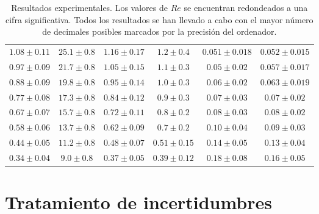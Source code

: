 \begin{table*}[h]
\begin{tabular}{cccccc}
$1.08 \pm 0.11$   &   $25.1 \pm 0.8$   &   $1.16 \pm 0.17$   &   $1.2 \pm 0.4$   &   $0.051 \pm 0.018$   &   $0.052 \pm 0.015$  \\
$0.97 \pm 0.09$   &   $21.7 \pm 0.8$   &   $1.05 \pm 0.15$   &   $1.1 \pm 0.3$   &   $0.05 \pm 0.02$   &   $0.057 \pm 0.017$  \\
$0.88 \pm 0.09$   &   $19.8 \pm 0.8$   &   $0.95 \pm 0.14$   &   $1.0 \pm 0.3$   &   $0.06 \pm 0.02$   &   $0.063 \pm 0.019$  \\
$0.77 \pm 0.08$   &   $17.3 \pm 0.8$   &   $0.84 \pm 0.12$   &   $0.9 \pm 0.3$   &   $0.07 \pm 0.03$   &   $0.07 \pm 0.02$  \\
$0.67 \pm 0.07$   &   $15.7 \pm 0.8$   &   $0.72 \pm 0.11$   &   $0.8 \pm 0.2$   &   $0.08 \pm 0.03$   &   $0.08 \pm 0.02$  \\
$0.58 \pm 0.06$   &   $13.7 \pm 0.8$   &   $0.62 \pm 0.09$   &   $0.7 \pm 0.2$   &   $0.10 \pm 0.04$   &   $0.09 \pm 0.03$  \\
$0.44 \pm 0.05$   &   $11.2 \pm 0.8$   &   $0.48 \pm 0.07$   &   $0.51 \pm 0.15$   &   $0.14 \pm 0.05$   &   $0.13 \pm 0.04$  \\
$0.34 \pm 0.04$   &   $9.0 \pm 0.8$    &   $0.37 \pm 0.05$   &   $0.39 \pm 0.12$   &   $0.18 \pm 0.08$   &   $0.16 \pm 0.05$  \\
			\bottomrule
		\end{tabular}
		\caption{Resultados experimentales. Los valores de $Re$ se encuentran redondeados a una cifra significativa. Todos los resultados se han llevado a cabo con el mayor número de decimales posibles marcados por la precisión del ordenador.}
		\label{table_exp}
\end{table*}

\section{Tratamiento de incertidumbres}


